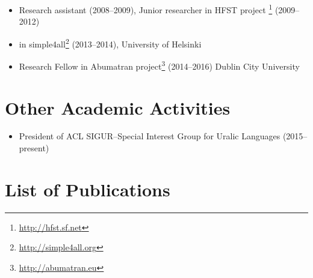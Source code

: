 \documentclass[a4paper]{article}
\begin{document}
\begin{itemize}
\item Research assistant (2008–2009), Junior researcher in HFST project \footnote{\url{http://hfst.sf.net}} (2009–2012)
\item in simple4all\footnote{\url{http://simple4all.org}} (2013–2014), University of Helsinki
\item Research Fellow in Abumatran project\footnote{\url{http://abumatran.eu}} (2014–2016) Dublin City University
\end{itemize}

\section{Other Academic Activities}

\begin{itemize}
\item President of ACL SIGUR–Special Interest Group for Uralic Languages (2015–present)
\end{itemize}

\section{List of Publications}
\end{document}
